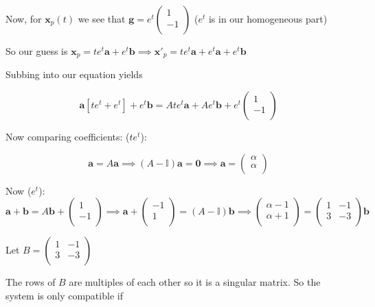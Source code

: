 \documentclass[10pt,landscape]{article}
\newcommand{\mbf}{\mathbf}
\newcommand{\bs}{\boldsymbol}
\begin{document}
\begin{multicols}{2}
Now, for $\mbf{x}_p(t)$ we see that $\mbf{g}=e^t\begin{pmatrix}
    1\\
    -1\\
\end{pmatrix}$ ($e^t$ is in our homogeneous part)

So our guess is $\mbf{x}_p = te^t\mbf{a}+e^t\mbf{b} \implies \mbf{x}'_p = te^t\mbf{a}+e^t\mbf{a} + e^t\mbf{b}$

Subbing into our equation yields

$$\mbf{a}[te^t+e^t]+e^t\mbf{b} = Ate^t\mbf{a}+Ae^t\mbf{b} + e^t\begin{pmatrix}
    1\\
    -1\\
\end{pmatrix}$$

Now comparing coefficients: ($te^t$):

$$\mbf{a} = A\mbf{a} \implies (A-\mathbb{I})\mbf{a} = \bs{0} \implies \mbf{a} = \begin{pmatrix}
    \alpha\\
    \alpha\\
\end{pmatrix}$$

Now ($e^t$):
$\mbf{a}+\mbf{b} = A\mbf{b} +\begin{pmatrix}
    1\\
    -1\\
\end{pmatrix} \implies \mbf{a}+\begin{pmatrix}
    -1\\
    1\\
\end{pmatrix} = (A-\mathbb{I})\mbf{b} \implies \begin{pmatrix}
    \alpha-1\\
    \alpha+1\\
\end{pmatrix}=\begin{pmatrix}
    1 & -1\\
    3 & -3\\
\end{pmatrix}\mbf{b}$

Let $B = \begin{pmatrix}
    1 & -1\\
    3 & -3\\
\end{pmatrix}$

The rows of $B$ are multiples of each other so it is a singular matrix. So the system is only compatible if 


\end{multicols}
\end{document}
